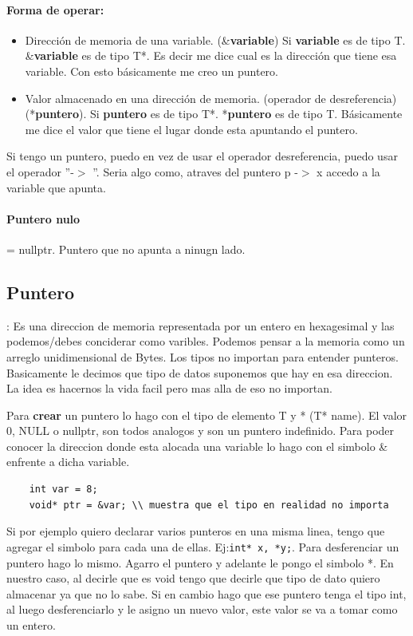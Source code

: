 \documentclass[11pt]{article}
\begin{document}
\paragraph{Forma de operar:}
\begin{itemize}
    \item Dirección de memoria de una variable. (\&\textbf{variable})
Si \textbf{variable} es de tipo T.
\&\textbf{variable} es de tipo T*.
Es decir me dice cual es la dirección que tiene esa variable.
Con esto básicamente me creo un puntero.
    \item Valor almacenado en una dirección de memoria. (operador de desreferencia)
        (*\textbf{puntero}).
Si \textbf{puntero} es de tipo T*.
*\textbf{puntero} es de tipo T.
Básicamente me dice el valor que tiene el lugar donde esta apuntando el puntero.
\end{itemize}

Si tengo un puntero, puedo en vez de usar el operador desreferencia, puedo usar
el operador  ''-$>$ ''.
Seria algo como, atraves del puntero p -$>$ x accedo a la variable que apunta.

\paragraph{Puntero nulo} = nullptr.
Puntero que no apunta a ninugn lado.
\subsection{Puntero}: Es una direccion de memoria representada por un entero en
hexagesimal y las podemos/debes conciderar como varibles.
Podemos pensar a la memoria como un arreglo unidimensional de Bytes.
Los tipos no importan para entender punteros.
Basicamente le decimos que tipo de datos suponemos que hay en esa direccion.
La idea es hacernos la vida facil pero mas alla de eso no importan.

Para \textbf{crear} un puntero lo hago con el tipo de elemento T y * (T* name).
El valor 0, NULL o nullptr, son todos analogos y son un puntero indefinido.
Para poder conocer la direccion donde esta alocada una variable lo hago con el simbolo
\& enfrente a dicha variable.
\begin{lstlisting}
    int var = 8;
    void* ptr = &var; \\ muestra que el tipo en realidad no importa
\end{lstlisting}

Si por ejemplo quiero declarar varios punteros en una misma linea,
tengo que agregar el simbolo para cada una de ellas.
Ej:\texttt{int* x, *y;}.
Para desferenciar un puntero hago lo mismo.
Agarro el puntero y adelante le pongo el simbolo *.
En nuestro caso, al decirle que es void tengo que decirle que tipo de dato
quiero almacenar ya que no lo sabe.
Si en cambio hago que ese puntero tenga el tipo int, al luego desferenciarlo y
le asigno un nuevo valor, este valor se va a tomar como un entero.
\end{document}
